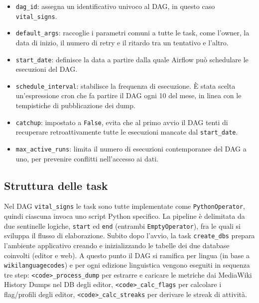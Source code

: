 \begin{itemize}
    \item \texttt{dag\_id}: assegna un identificativo univoco al DAG, in questo caso \texttt{vital\_signs}.
    \item \texttt{default\_args}: raccoglie i parametri comuni a tutte le task, come l'owner, la data di inizio, il numero di retry e il ritardo tra un tentativo e l'altro.
    \item \texttt{start\_date}: definisce la data a partire dalla quale Airflow può schedulare le esecuzioni del DAG.
    \item \texttt{schedule\_interval}: stabilisce la frequenza di esecuzione. È stata scelta un'espressione cron che fa partire il DAG ogni 10 del mese, in linea con le tempistiche di pubblicazione dei dump.
    \item \texttt{catchup}: impostato a \texttt{False}, evita che al primo avvio il DAG tenti di recuperare retroattivamente tutte le esecuzioni mancate dal \texttt{start\_date}.
    \item \texttt{max\_active\_runs}: limita il numero di esecuzioni contemporanee del DAG a uno, per prevenire conflitti nell'accesso ai dati.
\end{itemize}


\subsection{Struttura delle task}
\label{subsec:struttura_task}

Nel DAG \texttt{vital\_signs} le task sono tutte implementate come \texttt{PythonOperator},
quindi ciascuna invoca uno script Python specifico.
La pipeline è delimitata da due sentinelle logiche, \texttt{start} ed \texttt{end} (entrambi \texttt{EmptyOperator}), fra le quali si sviluppa il flusso di elaborazione.
Subito dopo l’avvio, la task \texttt{create\_dbs} prepara l’ambiente applicativo creando e inizializzando le tabelle dei due database coinvolti (editor e web).
A questo punto il DAG si ramifica per lingua (in base a \texttt{wikilanguagecodes}) e per ogni edizione linguistica vengono eseguiti in sequenza tre step:
\texttt{<code>\_process\_dump} per estrarre e caricare le metriche dai MediaWiki History Dumps nel DB degli editor,
\texttt{<code>\_calc\_flags} per calcolare i flag/profili degli editor,
\texttt{<code>\_calc\_streaks} per derivare le streak di attività.

